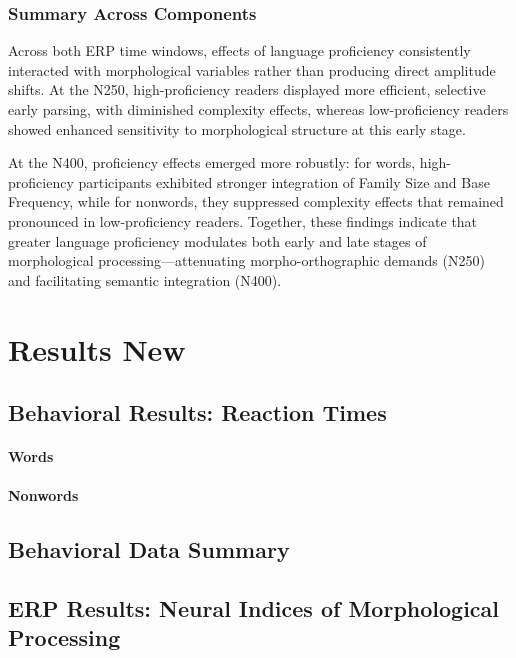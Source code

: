 \documentclass[preprint,12pt, authoryear, review]{elsarticle}
\begin{document}
\subsubsection{Summary Across Components}

Across both ERP time windows, effects of language proficiency consistently interacted with morphological variables rather than producing direct amplitude shifts.
At the N250, high-proficiency readers displayed more efficient, selective early parsing, with diminished complexity effects, whereas low-proficiency readers showed enhanced sensitivity to morphological structure at this early stage.

At the N400, proficiency effects emerged more robustly: for words, high-proficiency participants exhibited stronger integration of Family Size and Base Frequency, while for nonwords, they suppressed complexity effects that remained pronounced in low-proficiency readers.
Together, these findings indicate that greater language proficiency modulates both early and late stages of morphological processing—attenuating morpho-orthographic demands (N250) and facilitating semantic integration (N400).

\section{Results New}

	\subsection{Behavioral Results: Reaction Times}

		\paragraph*{Words}

		\paragraph*{Nonwords}

	\subsection{Behavioral Data Summary}

	\subsection{ERP Results: Neural Indices of Morphological Processing}
\end{document}
